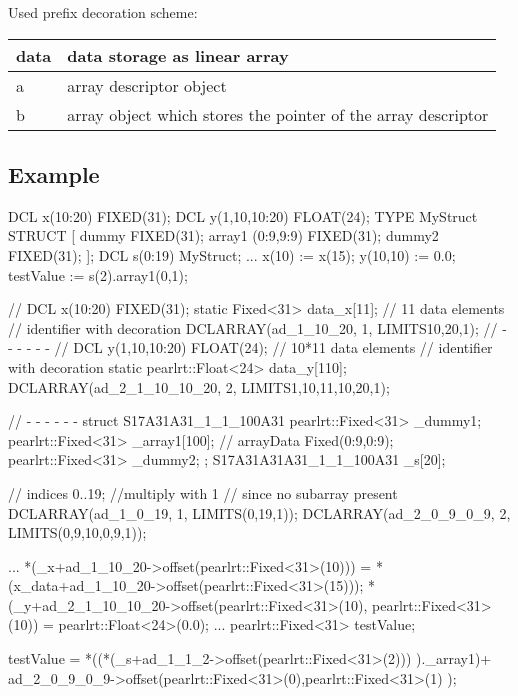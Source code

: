 Used prefix decoration scheme:

\begin{tabular}{|l|l|}
\hline
data & data storage as linear array \\
\hline
a & array descriptor object \\
\hline
b & array object which stores the pointer of the array descriptor \\
\hline
\end{tabular}

\subsection{Example}

\begin{PEARLCode}
DCL x(10:20) FIXED(31); 
DCL y(1,10,10:20) FLOAT(24); 
TYPE MyStruct STRUCT [
           dummy FIXED(31);
           array1 (0:9,9:9) FIXED(31);
           dummy2 FIXED(31);
           ];
DCL s(0:19) MyStruct;
...
x(10) := x(15);
y(10,10) := 0.0;
testValue := s(2).array1(0,1);
\end{PEARLCode}


\begin{CppCode}
// DCL x(10:20) FIXED(31); 
static Fixed<31> data_x[11]; // 11 data elements
                             // identifier with decoration
DCLARRAY(ad_1_10_20, 1, LIMITS{{10,20,1}});
// - - - - - - 
// DCL y(1,10,10:20) FLOAT(24); 
 // 10*11 data elements
 // identifier with decoration
static pearlrt::Float<24> data_y[110];
DCLARRAY(ad_2_1_10_10_20, 2, LIMITS{{1,10,11},{10,20,1}});

// - - - - - - 
   struct S17A31A31_1_1_100A31 {
      pearlrt::Fixed<31> _dummy1;
      pearlrt::Fixed<31> _array1[100];
         // arrayData Fixed(0:9,0:9);
      pearlrt::Fixed<31> _dummy2;
   } ;
   S17A31A31A31_1_1_100A31 _s[20]; 

                        // indices 0..19;
                        //multiply with 1
                        // since no subarray present
   DCLARRAY(ad_1_0_19, 1, LIMITS({{0,19,1}}));
   DCLARRAY(ad_2_0_9_0_9, 2, LIMITS({{0,9,10},{0,9,1}}));

...
   *(_x+ad_1_10_20->offset(pearlrt::Fixed<31>(10))) =
             *(x_data+ad_1_10_20->offset(pearlrt::Fixed<31>(15)));
   *(_y+ad_2_1_10_10_20->offset(pearlrt::Fixed<31>(10),
            pearlrt::Fixed<31>(10)) =
                          pearlrt::Float<24>(0.0);
...
   pearlrt::Fixed<31> testValue;

   testValue = 
        *((*(_s+ad_1_1_2->offset(pearlrt::Fixed<31>(2))) )._array1)+
             ad_2_0_9_0_9->offset(pearlrt::Fixed<31>(0),pearlrt::Fixed<31>(1)
        );

\end{CppCode}

